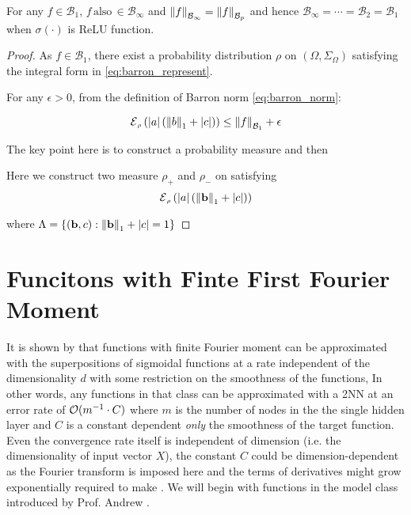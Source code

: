 \begin{lemma}
    \label{lamma:equivalence_barron_space}

    For any $f \in \mathcal{B}_1$, $f
        \,\text{also}\, \in \mathcal{B}_{\infty}$ and $\left\| {f} \right\|_{\mathcal{B}_{\infty}} =
        \left\| {f} \right\|_{\mathcal{B}_{p}}$ and hence $ \mathcal{B}_{\infty} = \cdots =
        \mathcal{B}_{2} = \mathcal{B}_1$ when $\sigma(\cdot)$ is ReLU function.
\end{lemma}

\begin{proof}
    As $f \in \mathcal{B}_1$,  there exist a probability distribution $\rho$ on
    $(\Omega, \Sigma_\Omega)$ satisfying the integral form in
    \eqref{eq:barron_represent}.

    For any $\epsilon > 0$, from the definition of Barron norm
    \eqref{eq:barron_norm}:

    \begin{equation}
        \ERWi{\rho}{\abs{a}(\norm{b}_1 + \abs{c})} \leq \barronnorm{f}{1} + \epsilon
    \end{equation}


    The key point here is to construct a probability measure and then

    Here we construct two measure $\rho_+$ and $\rho_-$ on satisfying
    \begin{equation*}
        \ERWi{\rho}{\abs{a}(\norm{\mathbf{b}}_1 + \abs{c})}
    \end{equation*}


    where $\Lambda = \{(\mathbf{b}, c): \left\| \mathbf{b} \right\|_1 + \left| c \right| = 1\}$
\end{proof}


\section{Funcitons with Finte First Fourier Moment}
\label{sec:spectral_norm}

It is shown by \cite{barronUniversalApproximationBounds1993} that functions with
finite Fourier moment can be approximated with the superpositions of sigmoidal
functions at a rate independent of the dimensionality $d$ with some restriction
on the smoothness of the functions, In other words, any functions in that class
can be approximated with a 2NN at an error rate of $\mathcal{O}(m^{-1} \cdot C)$ where
$m$ is the number of nodes in the the single hidden layer and $C$ is a constant
dependent \textit{only} the smoothness of the target function. Even the
convergence rate itself is independent of dimension (i.e. the dimensionality of
input vector $X$), the constant $C$ could be dimension-dependent as the Fourier
transform is imposed here and the terms of derivatives might grow exponentially
required to make . We will begin with functions in the model class
introduced by Prof. Andrew \cite{barronUniversalApproximationBounds1993}.

